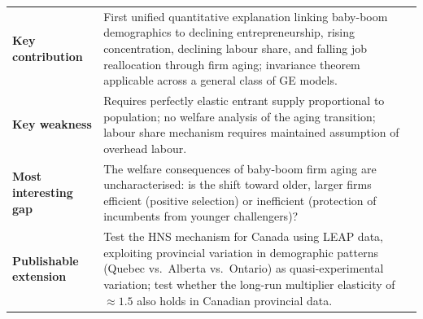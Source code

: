 \vspace{6pt}
\begin{quickref}
\begin{tabularx}{\linewidth}{@{}lX@{}}
\textbf{Key contribution} &
  First unified quantitative explanation linking baby-boom demographics to
  declining entrepreneurship, rising concentration, declining labour share,
  and falling job reallocation through firm aging; invariance theorem
  applicable across a general class of GE models. \\[4pt]
\textbf{Key weakness} &
  Requires perfectly elastic entrant supply proportional to population; no
  welfare analysis of the aging transition; labour share mechanism requires
  maintained assumption of overhead labour. \\[4pt]
\textbf{Most interesting gap} &
  The welfare consequences of baby-boom firm aging are uncharacterised: is
  the shift toward older, larger firms efficient (positive selection) or
  inefficient (protection of incumbents from younger challengers)? \\[4pt]
\textbf{Publishable extension} &
  Test the HNS mechanism for Canada using LEAP data, exploiting provincial
  variation in demographic patterns (Quebec vs.\ Alberta vs.\ Ontario) as
  quasi-experimental variation; test whether the long-run multiplier
  elasticity of $\approx 1.5$ also holds in Canadian provincial data.
\end{tabularx}
\end{quickref}
